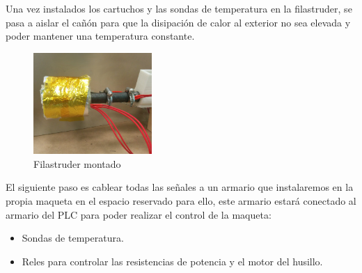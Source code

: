 Una vez instalados los cartuchos y las sondas de temperatura en la filastruder, se pasa a aislar el cañón para que la disipación de calor al exterior no sea elevada y poder mantener una temperatura constante.
    \begin{figure}[H]
            \centering
            \includegraphics[width=0.4\textwidth]{images/filaextruder/IMG_20150814_132929.jpg}
            \caption{Filastruder montado}
            \label{fig:fila_montaje4}
    \end{figure}

El siguiente paso es cablear todas las señales a un armario que instalaremos en la propia maqueta en el espacio reservado para ello, este armario estará conectado al armario del PLC para poder realizar el control de la maqueta:

\begin{itemize}
	\item Sondas de temperatura.
	\item Reles para controlar las resistencias de potencia y el motor del husillo.
\end{itemize}


